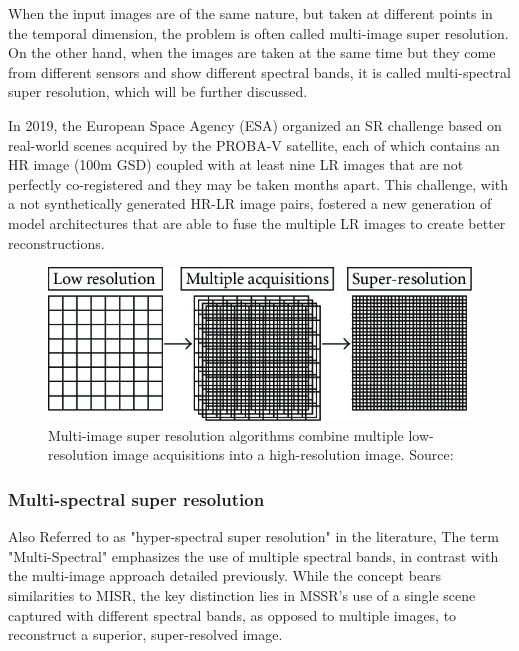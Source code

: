         When the input images are of the same nature, but taken at different points in the temporal dimension, the problem is often called multi-image super resolution. On the other hand, when the images are taken at the same time but they come from different sensors and show different spectral bands, it is called multi-spectral super resolution, which will be further discussed. 

        In 2019, the European Space Agency (ESA) organized an SR challenge  \cite{märtens2019superresolution} based on real-world scenes acquired by the PROBA-V satellite, each of which contains an HR image (100m GSD) coupled with at least nine LR images that are not perfectly co-registered and they may be taken months apart. This challenge, with a not synthetically generated HR-LR image pairs, fostered a new generation of model architectures that are able to fuse the multiple LR images to create better reconstructions.

        \begin{figure}[h!]
            \centering
            \includegraphics[scale=1.5]{Includes/2-MISR.jpeg}
            \caption{Multi-image super resolution algorithms combine multiple low-resolution image acquisitions into a high-resolution image. Source: \cite{MISR2007}}
            \label{fig:2-SR-ill-posed}
        \end{figure}
        
        \subsubsection{Multi-spectral super resolution}

        Also Referred to as "hyper-spectral super resolution" in the literature, The term "Multi-Spectral" emphasizes the use of multiple spectral bands, in contrast with the multi-image approach detailed previously. While the concept bears similarities to MISR, the key distinction lies in MSSR's use of a single scene captured with different spectral bands, as opposed to multiple images, to reconstruct a superior, super-resolved image.

